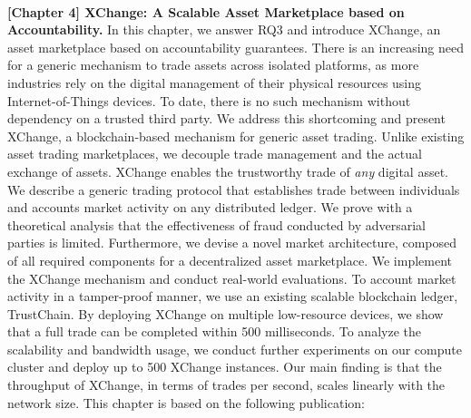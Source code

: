 \\

\textbf{[Chapter 4] XChange: A Scalable Asset Marketplace based on Accountability.}
In this chapter, we answer RQ3 and introduce XChange, an asset marketplace based on accountability guarantees.
There is an increasing need for a generic mechanism to trade assets across isolated platforms, as more industries rely on the digital management of their physical resources using Internet-of-Things devices.
To date, there is no such mechanism without dependency on a trusted third party.
We address this shortcoming and present XChange, a blockchain-based mechanism for generic asset trading.
Unlike existing asset trading marketplaces, we decouple trade management and the actual exchange of assets.
XChange enables the trustworthy trade of \emph{any} digital asset.
We describe a generic trading protocol that establishes trade between individuals and accounts market activity on any distributed ledger.
We prove with a theoretical analysis that the effectiveness of fraud conducted by adversarial parties is limited.
Furthermore, we devise a novel market architecture, composed of all required components for a decentralized asset marketplace.
We implement the XChange mechanism and conduct real-world evaluations.
To account market activity in a tamper-proof manner, we use an existing scalable blockchain ledger, TrustChain.
By deploying XChange on multiple low-resource devices, we show that a full trade can be completed within 500 milliseconds.
To analyze the scalability and bandwidth usage, we conduct further experiments on our compute cluster and deploy up to 500 XChange instances.
Our main finding is that the throughput of XChange, in terms of trades per second, scales linearly with the network size.
This chapter is based on the following publication:

\\


